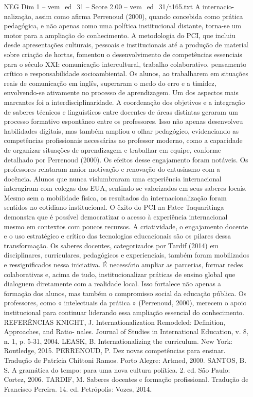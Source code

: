 \begin{textsample}{NEG Dim 1 – vem\_ed\_31 – Score 2.00 – vem\_ed\_31/t165.txt}
A internacio- nalização, assim como afirma Perrenoud (2000), quando concebida como prática pedagógica, e não apenas como uma política institucional distante, torna-se um motor para a ampliação do conhecimento.
A metodologia do PCI, que incluiu desde apresentações culturais, pessoais e institucionais até a produção de material sobre criação de hortas, fomentou o desenvolvimento de competências essenciais para o século XXI: comunicação intercultural, trabalho colaborativo, pensamento crítico e responsabilidade socioambiental.
Os alunos, ao trabalharem em situações reais de comunicação em inglês, superaram o medo do erro e a timidez, envolvendo-se ativamente no processo de aprendizagem.
Um dos aspectos mais marcantes foi a interdisciplinaridade.
A coordenação dos objetivos e a integração de saberes técnicos e linguísticos entre docentes de áreas distintas geraram um processo formativo espontâneo entre os professores.
Isso não apenas desenvolveu habilidades digitais, mas também ampliou o olhar pedagógico, evidenciando as competências profissionais necessárias ao professor moderno, como a capacidade de organizar situações de aprendizagem e trabalhar em equipe, conforme detalhado por Perrenoud (2000).
Os efeitos desse engajamento foram notáveis.
Os professores relataram maior motivação e renovação do entusiasmo com a docência.
Alunos que nunca vislumbraram uma experiência internacional interagiram com colegas dos EUA, sentindo-se valorizados em seus saberes locais.
Mesmo sem a mobilidade física, os resultados da internacionalização foram sentidos no cotidiano institucional.
O êxito do PCI na Fatec Taquaritinga demonstra que é possível democratizar o acesso à experiência internacional mesmo em contextos com poucos recursos.
A criatividade, o engajamento docente e o uso estratégico e crítico das tecnologias educacionais são os pilares dessa transformação.
Os saberes docentes, categorizados por Tardif (2014) em disciplinares, curriculares, pedagógicos e experienciais, também foram mobilizados e ressignificados nessa iniciativa.
É necessário ampliar as parcerias, formar redes colaborativas e, acima de tudo, institucionalizar práticas de ensino global que dialoguem diretamente com a realidade local.
Isso fortalece não apenas a formação dos alunos, mas também o compromisso social da educação pública.
Os professores, como « intelectuais da prática » (Perrenoud, 2000), merecem o apoio institucional para continuar liderando essa ampliação essencial do conhecimento.
REFERÊNCIAS KNIGHT, J.
Internationalization Remodeled: Definition, Approaches, and Ratio- nales.
Journal of Studies in International Education, v. 8, n. 1, p. 5-31, 2004.
LEASK, B.
Internationalizing the curriculum.
New York: Routledge, 2015.
PERRENOUD, P.
Dez novas competências para ensinar.
Tradução de Patrícia Chittoni Ramos.
Porto Alegre: Artmed, 2000.
SANTOS, B.
S.
A gramática do tempo: para uma nova cultura política. 2. ed.
São Paulo: Cortez, 2006.
TARDIF, M.
Saberes docentes e formação profissional.
Tradução de Francisco Pereira. 14. ed.
Petrópolis: Vozes, 2014.

\end{textsample}
